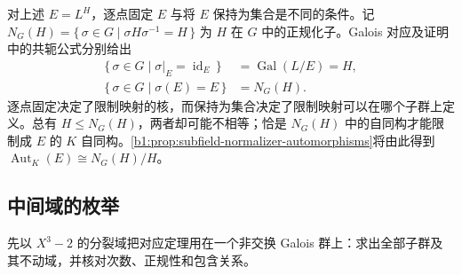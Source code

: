 \ProseParagraphBreak
对上述 \(E=L^H\)，逐点固定 \(E\) 与将 \(E\) 保持为集合是不同的条件。记 \(N_G(H)=\{\,\sigma\in G\mid\sigma H\sigma^{-1}=H\,\}\) 为 \(H\) 在 \(G\) 中的正规化子。Galois 对应及证明中的共轭公式分别给出
\[
	\begin{aligned}
		\{\,\sigma\in G\mid\sigma|_E=\operatorname{id}_E\,\} &=\operatorname{Gal}(L/E)=H,\\
		\{\,\sigma\in G\mid\sigma(E)=E\,\}&=N_G(H).
	\end{aligned}
\]
逐点固定决定了限制映射的核，而保持为集合决定了限制映射可以在哪个子群上定义。总有 \(H\leq N_G(H)\)，两者却可能不相等；恰是 \(N_G(H)\) 中的自同构才能限制成 \(E\) 的 \(K\) 自同构。\cref{b1:prop:subfield-normalizer-automorphisms}将由此得到 \(\operatorname{Aut}_K(E)\cong N_G(H)/H\)。

\subsection{中间域的枚举}
\label{b1:subsec:1904:01}

先以 \(X^3-2\) 的分裂域把对应定理用在一个非交换 Galois 群上：求出全部子群及其不动域，并核对次数、正规性和包含关系。

